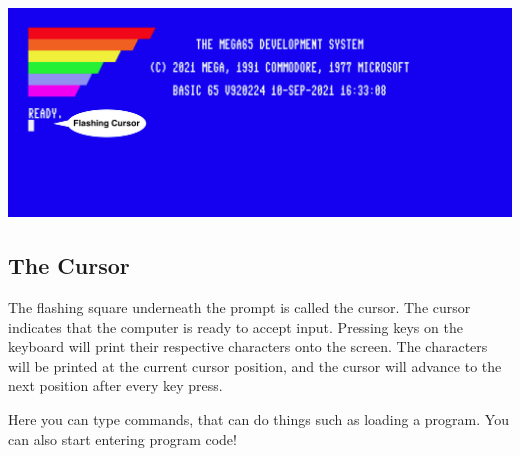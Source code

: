 \includegraphics[width=\linewidth]{images/introduction-screen/switched-on.png}

\subsection{The Cursor}

The flashing square underneath the  prompt is called the cursor. The cursor indicates that the computer is ready to accept input. Pressing keys on the keyboard will print their respective characters onto the screen. The characters will be printed at the current cursor position, and the cursor will advance to the next position after every key press.

Here you can type commands, that can do things such as loading a program. You can also start entering program code!

